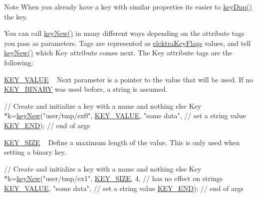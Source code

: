 \begin{DoxyNote}{Note}
When you already have a key with similar properties its easier to \hyperlink{group__key_gae6ec6a60cc4b8c1463fa08623d056ce3}{key\+Dup()} the key.
\end{DoxyNote}
You can call \hyperlink{group__key_gad23c65b44bf48d773759e1f9a4d43b89}{key\+New()} in many different ways depending on the attribute tags you pass as parameters. Tags are represented as \hyperlink{group__key_ga9b703ca49f48b482def322b77d3e6bc8}{elektra\+Key\+Flags} values, and tell \hyperlink{group__key_gad23c65b44bf48d773759e1f9a4d43b89}{key\+New()} which Key attribute comes next. The Key attribute tags are the following\+:
\begin{DoxyItemize}
\item \hyperlink{group__key_gga9b703ca49f48b482def322b77d3e6bc8ac66e4a49d09212b79f5754ca6db5bd2e}{K\+E\+Y\+\_\+\+V\+A\+L\+UE} ~\newline
 Next parameter is a pointer to the value that will be used. If no \hyperlink{group__key_gga9b703ca49f48b482def322b77d3e6bc8a1ca18d4e094ae7487d35ecedda2235ff}{K\+E\+Y\+\_\+\+B\+I\+N\+A\+RY} was used before, a string is assumed. 
\begin{DoxyCodeInclude}
\textcolor{comment}{// Create and initialize a key with a name and nothing else}
Key *k=\hyperlink{group__key_gad23c65b44bf48d773759e1f9a4d43b89}{keyNew}(\textcolor{stringliteral}{"user/tmp/ex0"},
        \hyperlink{group__key_gga9b703ca49f48b482def322b77d3e6bc8ac66e4a49d09212b79f5754ca6db5bd2e}{KEY\_VALUE}, \textcolor{stringliteral}{"some data"},    \textcolor{comment}{// set a string value}
        \hyperlink{group__key_gga9b703ca49f48b482def322b77d3e6bc8aa8adb6fcb92dec58fb19410eacfdd403}{KEY\_END});                  \textcolor{comment}{// end of args}
\end{DoxyCodeInclude}

\item \hyperlink{group__key_gga9b703ca49f48b482def322b77d3e6bc8a6d531b5c41445d19d0452eebdccbfa01}{K\+E\+Y\+\_\+\+S\+I\+ZE} ~\newline
 Define a maximum length of the value. This is only used when setting a binary key. 
\begin{DoxyCodeInclude}
\textcolor{comment}{// Create and initialize a key with a name and nothing else}
Key *k=\hyperlink{group__key_gad23c65b44bf48d773759e1f9a4d43b89}{keyNew}(\textcolor{stringliteral}{"user/tmp/ex1"},
        \hyperlink{group__key_gga9b703ca49f48b482def322b77d3e6bc8a6d531b5c41445d19d0452eebdccbfa01}{KEY\_SIZE}, 4,               \textcolor{comment}{// has no effect on strings}
        \hyperlink{group__key_gga9b703ca49f48b482def322b77d3e6bc8ac66e4a49d09212b79f5754ca6db5bd2e}{KEY\_VALUE}, \textcolor{stringliteral}{"some data"},    \textcolor{comment}{// set a string value}
        \hyperlink{group__key_gga9b703ca49f48b482def322b77d3e6bc8aa8adb6fcb92dec58fb19410eacfdd403}{KEY\_END});                  \textcolor{comment}{// end of args}
\end{DoxyCodeInclude}


\end{DoxyItemize}
